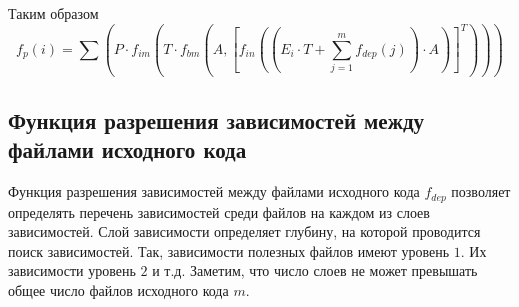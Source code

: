 Таким образом
  \begin{equation}
    f_{p}(i) = \sum(P \cdot f_{im}(T \cdot f_{bm}(A, [f_{in}((E_{i} \cdot T + \sum^{m}_{j = 1}f_{dep}(j)) \cdot A)]^{T})))
  \end{equation}

\subsection*{Функция разрешения зависимостей между файлами исходного кода}
Функция разрешения зависимостей между файлами исходного кода $f_{dep}$ позволяет определять перечень зависимостей среди файлов на каждом из слоев зависимостей. Слой зависимости определяет глубину, на которой проводится поиск зависимостей. Так, зависимости полезных файлов имеют уровень $1$. Их зависимости уровень $2$ и т.д. Заметим, что число слоев не может превышать общее число файлов исходного кода $m$.

